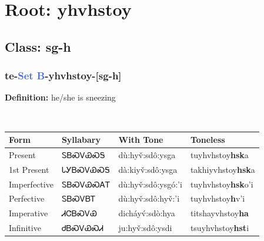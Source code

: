 \needspace{4in}
\section*{Root: yhvhstoy}
\nopagebreak
{}
\needspace{3in}
\subsection*{Class: sg-h}
\nopagebreak
\needspace{2in}
\subsubsection*{te{-}\textcolor{RoyalBlue}{Set B}{-}\textbf{yhvhstoy}{-}[sg-h]}
\nopagebreak
\textbf{Definition: } he/she is sneezing
\\[0.5em]
\begin{tabularx}{\textwidth}{l X X X}%
\toprule%
\textbf{Form}&\textbf{Syllabary}&\textbf{With Tone}&\textbf{Toneless}\\%
\midrule%
Present&ᏚᏴᏍᏙᏯᏍᎦ&dù:hyv̌:sdô:ysga&tuyhvhstoy\textbf{hsk}a\\%
1st Present&ᏓᎩᏴᏍᏙᏯᏍᎦ&dà:kiyv̌:sdô:ysga&takhiyvhstoy\textbf{hsk}a\\%
Imperfective&ᏚᏴᏍᏙᏯᏍᎪᎢ&dù:hyv̌:sdô:ysgó:’i&tuyhvhstoy\textbf{hsk}o'i\\%
Perfective&ᏚᏴᏍᏙᏴᎢ&dù:hyv̌:sdô:hyv̌:’i&tuyhvhstoy\textbf{h}v'i\\%
Imperative&ᏗᏣᏴᏍᏙᏯ&dicháyv́:sdò:hya&titshayvhstoy\textbf{ha}\\%
Infinitive&ᏧᏴᏍᏙᏯᏍᏗ&ju:hyv̌:sdô:ysdi&tsuyhvhstoy\textbf{hst}i\\%
\bottomrule%
\end{tabularx}
\\[1em]